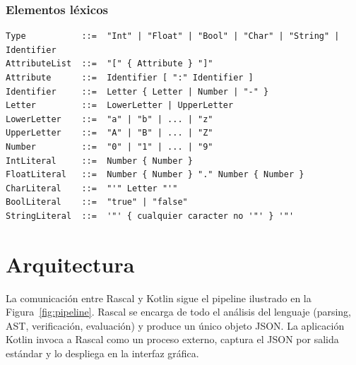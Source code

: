 \documentclass[12pt]{article}
\begin{document}
\subsubsection*{Elementos léxicos}

\begin{lstlisting}[style=rascalstyle, basicstyle=\ttfamily\small, mathescape, breaklines=false]
Type           ::=  "Int" | "Float" | "Bool" | "Char" | "String" | Identifier
AttributeList  ::=  "[" { Attribute } "]"
Attribute      ::=  Identifier [ ":" Identifier ]
Identifier     ::=  Letter { Letter | Number | "-" }
Letter         ::=  LowerLetter | UpperLetter
LowerLetter    ::=  "a" | "b" | ... | "z"
UpperLetter    ::=  "A" | "B" | ... | "Z"
Number         ::=  "0" | "1" | ... | "9"
IntLiteral     ::=  Number { Number }
FloatLiteral   ::=  Number { Number } "." Number { Number }
CharLiteral    ::=  "'" Letter "'"
BoolLiteral    ::=  "true" | "false"
StringLiteral  ::=  '"' { cualquier caracter no '"' } '"'
\end{lstlisting}

\section{Arquitectura}

La comunicación entre Rascal y Kotlin sigue el pipeline ilustrado en la
Figura~\ref{fig:pipeline}. Rascal se encarga de todo el análisis del lenguaje
(parsing, AST, verificación, evaluación) y produce un único objeto JSON. La
aplicación Kotlin invoca a Rascal como un proceso externo, captura el JSON
por salida estándar y lo despliega en la interfaz gráfica.
\end{document}

